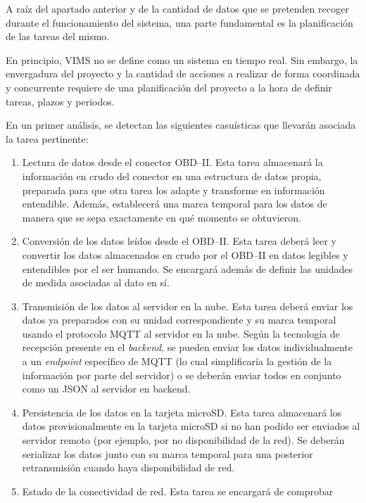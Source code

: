 A raíz del apartado anterior y de la cantidad de datos que se pretenden recoger
durante el funcionamiento del sistema, una parte fundamental es la planificación
de las tareas del mismo.

En principio, \ac{VIMS} no se define como un sistema en tiempo real. Sin embargo,
la envergadura del proyecto y la cantidad de acciones a realizar de forma coordinada
y concurrente requiere de una planificación del proyecto a la hora de definir tareas,
plazos y periodos.

En un primer análisis, se detectan las siguientes casuísticas que llevarán asociada
la tarea pertinente:

\begin{enumerate}
  \item Lectura de datos desde el conector \ac{OBD}--II. Esta tarea almacenará la
        información en crudo del conector en una estructura de datos propia, preparada
        para que otra tarea los adapte y transforme en información entendible. Además,
        establecerá una marca temporal para los datos de manera que se sepa exactamente
        en qué momento se obtuvieron.
  \item Conversión de los datos leídos desde el \ac{OBD}--II. Esta tarea deberá
        leer y convertir los datos almacenados en crudo por el \ac{OBD}--II en
        datos legibles y entendibles por el ser humando. Se encargará además de
        definir las unidades de medida asociadas al dato en sí.
  \item Transmisión de los datos al servidor en la nube. Esta tarea deberá enviar
        los datos ya preparados con su unidad correspondiente y su marca temporal
        usando el protocolo MQTT al servidor en la nube. Según la tecnología de
        recepción presente en el \textit{backend}, se pueden enviar los datos
        individualmente a un \textit{endpoint} específico de MQTT (lo cual simplificaría
        la gestión de la información por parte del servidor) o se deberán enviar todos
        en conjunto como un JSON al servidor en backend.
  \item Persistencia de los datos en la tarjeta microSD. Esta tarea almacenará
        los datos provisionalmente en la tarjeta microSD si no han podido ser enviados
        al servidor remoto (por ejemplo, por no disponibilidad de la red). Se deberán
        serializar los datos junto con su marca temporal para una posterior retransmisión
        cuando haya disponibilidad de red.
  \item Estado de la conectividad de red. Esta tarea se encargará de comprobar

\end{enumerate}

